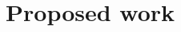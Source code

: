 \documentclass[10pt, onecolumn]{report}
\begin{document}
\maketitle

\tableofcontents

\newpage



\chapter{Proposed work}





 
\end{document}
